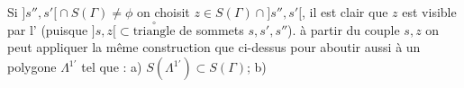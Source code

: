 Si $ {]s'',s'[}\cap S(\Gamma)\ne\phi$ on choisit $z\in S(\Gamma)\cap{]s'',s'[}$, il est clair que $z$ est visible  par l' (puisque $ {]s,z[}\subset\overset{\circ}{\text{triangle}}$ de sommets $s,s',s''$). à partir du couple $s,z$ on peut appliquer la même construction que ci-dessus pour aboutir aussi à un polygone $\Lambda^{1'}$ tel que : a) $S(\Lambda^{1'})\subset S(\Gamma)$; b)
